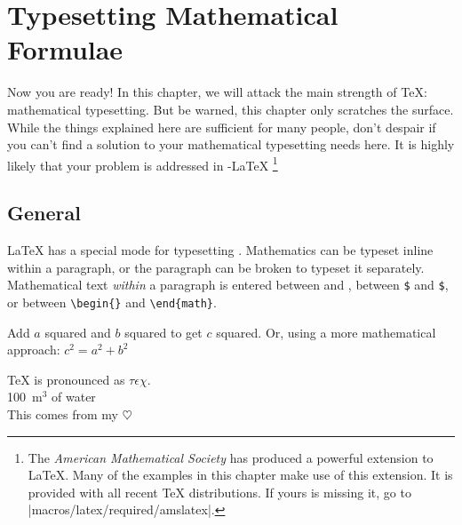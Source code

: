  
\chapter{Typesetting Mathematical Formulae}

\begin{intro}
  Now you are ready! In this chapter, we will attack the main strength
  of \TeX{}: mathematical typesetting. But be warned, this chapter
  only scratches the surface. While the things explained here are
  sufficient for many people, don't despair if you can't find a
  solution to your mathematical typesetting needs here. It is highly likely
  that your problem is addressed in \AmS-\LaTeX{}%
  \footnote{The \emph{American Mathematical Society} has produced a
  powerful extension to \LaTeX{}. Many of the examples in this
  chapter make use of this extension. It is provided with all recent
  \TeX{} distributions. If yours is missing it, go to \CTANref|macros/latex/required/amslatex|.}
\end{intro}
  
\section{General}

\LaTeX{} has a special mode for typesetting . Mathematics
can be typeset inline within a paragraph, or the paragraph can be broken to
typeset it separately. Mathematical text \emph{within} a paragraph is entered between \ci{(}
and \ci{)},  %
between \texttt{\$} and \texttt{\$}, or between %
\verb|\begin{|\verb|}| and \verb|\end{math}|.
\begin{example}
Add $a$ squared and $b$ squared 
to get $c$ squared. Or, using 
a more mathematical approach:
$c^{2}=a^{2}+b^{2}$
\end{example}
\begin{example}
\TeX{} is pronounced as 
\(\tau\epsilon\chi\).\\[6pt]
100~m$^{3}$ of water\\[6pt]
This comes from my
\begin{math}\heartsuit\end{math}
\end{example}

